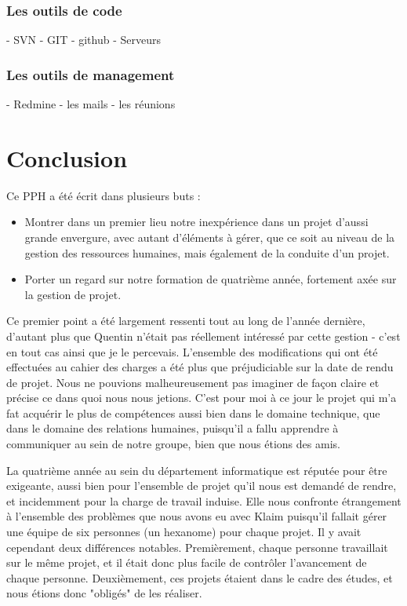 \documentclass{article}
\begin{document}
\subsubsection{Les outils de code}
- SVN
- GIT - github
- Serveurs
\subsubsection{Les outils de management}
- Redmine
- les mails
- les réunions
\section{Conclusion}

		Ce PPH a été écrit dans plusieurs buts : 
		\begin{itemize}
			\item Montrer dans un premier lieu notre inexpérience dans un projet d'aussi grande envergure, avec autant d'éléments à gérer, que ce soit au niveau de la gestion des ressources humaines, mais également de la conduite d'un projet.
			\item Porter un regard sur notre formation de quatrième année, fortement axée sur la gestion de projet. 
		\end{itemize}
		
		Ce premier point a été largement ressenti tout au long de l'année dernière, d'autant plus que Quentin n'était pas réellement intéressé par cette gestion - c'est en tout cas ainsi que je le percevais. L'ensemble des modifications qui ont été effectuées au cahier des charges a été plus que préjudiciable sur la date de rendu de projet. Nous ne pouvions malheureusement pas imaginer de façon claire et précise ce dans quoi nous nous jetions. C'est pour moi à ce jour le projet qui m'a fat acquérir le plus de compétences aussi bien dans le domaine technique, que dans le domaine des relations humaines, puisqu'il a fallu apprendre à communiquer au sein de notre groupe, bien que nous étions des amis. 
		
		La quatrième année au sein du département informatique est réputée pour être exigeante, aussi bien  pour l'ensemble de projet qu'il nous est demandé de rendre, et incidemment pour la charge de travail induise. Elle nous confronte étrangement à l'ensemble des problèmes que nous avons eu avec Klaim puisqu'il fallait gérer une équipe de six personnes (un hexanome) pour chaque projet. Il y avait cependant deux différences notables. Premièrement, chaque personne travaillait sur le même projet, et il était donc plus facile de contrôler l'avancement de chaque personne. Deuxièmement, ces projets étaient dans le cadre des études, et nous étions donc "obligés" de les réaliser.
		
\end{document}
